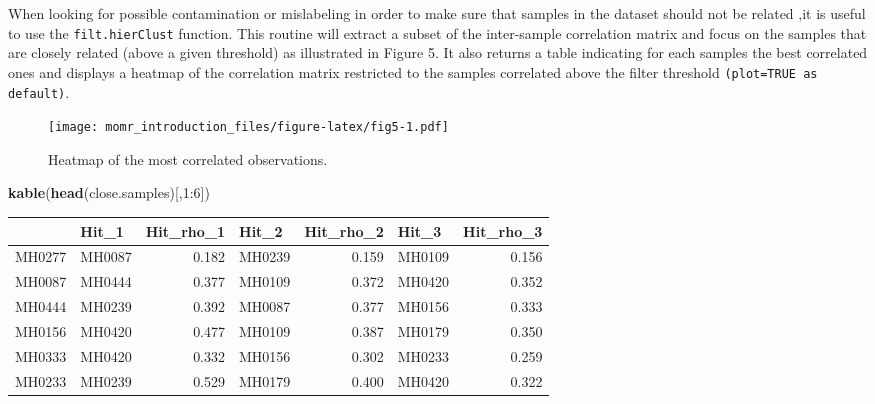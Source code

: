 \documentclass[]{article}
\newenvironment{Shaded}{\begin{snugshade}}{\end{snugshade}}
\newcommand{\KeywordTok}[1]{\textcolor[rgb]{0.13,0.29,0.53}{\textbf{{#1}}}}
\newcommand{\DataTypeTok}[1]{\textcolor[rgb]{0.13,0.29,0.53}{{#1}}}
\newcommand{\DecValTok}[1]{\textcolor[rgb]{0.00,0.00,0.81}{{#1}}}
\newcommand{\FloatTok}[1]{\textcolor[rgb]{0.00,0.00,0.81}{{#1}}}
\newcommand{\StringTok}[1]{\textcolor[rgb]{0.31,0.60,0.02}{{#1}}}
\newcommand{\CommentTok}[1]{\textcolor[rgb]{0.56,0.35,0.01}{\textit{{#1}}}}
\newcommand{\OtherTok}[1]{\textcolor[rgb]{0.56,0.35,0.01}{{#1}}}
\newcommand{\NormalTok}[1]{{#1}}
\begin{document}
When looking for possible contamination or mislabeling in order to make
sure that samples in the dataset should not be related ,it is useful to
use the \texttt{filt.hierClust} function. This routine will extract a
subset of the inter-sample correlation matrix and focus on the samples
that are closely related (above a given threshold) as illustrated in
Figure 5. It also returns a table indicating for each samples the best
correlated ones and displays a heatmap of the correlation matrix
restricted to the samples correlated above the filter threshold
\texttt{(plot=TRUE as default)}.

\begin{Shaded}
\end{Shaded}

\begin{figure}[htbp]
\centering
\texttt{[image: momr\_introduction\_files/figure-latex/fig5-1.pdf]}
\caption{Heatmap of the most correlated observations.}
\end{figure}

\begin{Shaded}
\begin{Highlighting}[]
\KeywordTok{kable}\NormalTok{(}\KeywordTok{head}\NormalTok{(close.samples)[,}\DecValTok{1}\NormalTok{:}\DecValTok{6}\NormalTok{])}
\end{Highlighting}
\end{Shaded}

\begin{longtable}[c]{@{}llrlrlr@{}}
\toprule
& Hit\_1 & Hit\_rho\_1 & Hit\_2 & Hit\_rho\_2 & Hit\_3 &
Hit\_rho\_3\tabularnewline
\midrule
\endhead
MH0277 & MH0087 & 0.182 & MH0239 & 0.159 & MH0109 & 0.156\tabularnewline
MH0087 & MH0444 & 0.377 & MH0109 & 0.372 & MH0420 & 0.352\tabularnewline
MH0444 & MH0239 & 0.392 & MH0087 & 0.377 & MH0156 & 0.333\tabularnewline
MH0156 & MH0420 & 0.477 & MH0109 & 0.387 & MH0179 & 0.350\tabularnewline
MH0333 & MH0420 & 0.332 & MH0156 & 0.302 & MH0233 & 0.259\tabularnewline
MH0233 & MH0239 & 0.529 & MH0179 & 0.400 & MH0420 & 0.322\tabularnewline
\bottomrule
\end{longtable}
\end{document}
